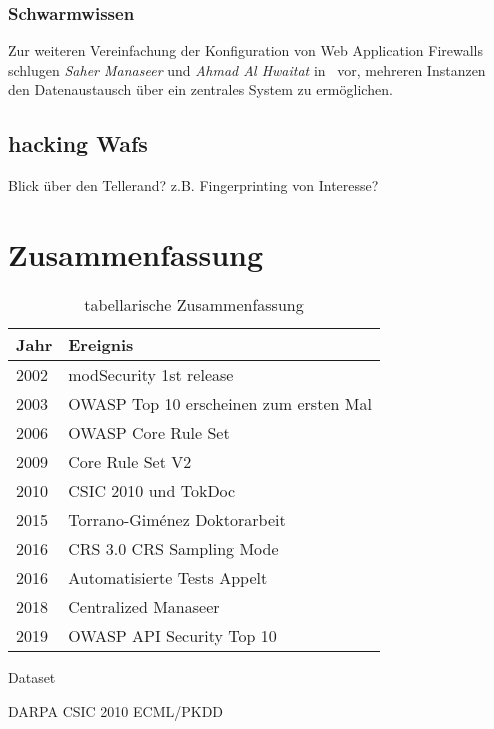 \subsubsection{Schwarmwissen}
Zur weiteren Vereinfachung der Konfiguration von Web Application Firewalls schlugen \emph{Saher Manaseer} und \emph{Ahmad Al Hwaitat} in~\cite{Manaseer2018} vor, mehreren Instanzen den Datenaustausch über ein zentrales System zu ermöglichen. 




\subsection{hacking Wafs}

\begin{neu}
  Blick über den Tellerand? z.B. Fingerprinting von Interesse?
\end{neu}


\section{Zusammenfassung}


\begin{table}[h]
    \centering
 
\begin{tabular}{lp{7cm}}
  \toprule
  Jahr & Ereignis\\
  \midrule
  2002 & modSecurity 1st release \\
  2003 & OWASP Top 10 erscheinen zum ersten Mal\\
  2006 & OWASP Core Rule Set \\
  2009 & Core Rule Set V2 \\
  2010 & CSIC 2010 und TokDoc \\
  2015 & Torrano-Giménez Doktorarbeit \\
  2016 & CRS 3.0 CRS Sampling Mode \\
  2016 & Automatisierte Tests Appelt \\
  2018 & Centralized Manaseer\\
  2019 & OWASP API Security Top 10\\
  \bottomrule
\end{tabular}
\caption{tabellarische Zusammenfassung}
\label{tab:zeitstrahl}
\end{table}

Dataset

DARPA
CSIC 2010
ECML/PKDD

